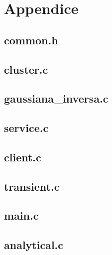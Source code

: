 \chapter{Appendice}\label{appendice}
\section{common.h}

\pagebreak
\section{cluster.c}

\pagebreak
\section{gaussiana\_inversa.c}

\pagebreak
\section{service.c}

\pagebreak
\section{client.c}

\pagebreak
\section{transient.c}

\pagebreak
\section{main.c}

\pagebreak
\section{analytical.c}
